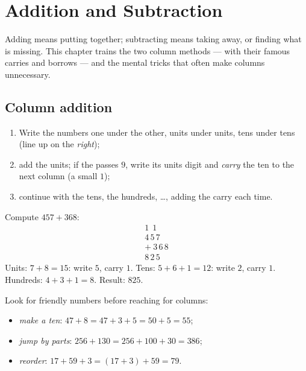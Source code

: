 \chapter{Addition and Subtraction}\label{ch:g3:addsub}

Adding means putting together; subtracting means taking away, or
finding what is missing. This chapter trains the two column methods
--- with their famous carries and borrows --- and the mental tricks
that often make columns unnecessary.

\section{Column addition}

\begin{method}\label{met:g3:addsub:add}
\begin{enumerate}
  \item Write the numbers one under the other, units under units,
        tens under tens (line up on the \emph{right});
  \item add the units; if the  passes $9$, write its units digit
        and \emph{carry} the ten to the next column (a small $1$);
  \item continue with the tens, the hundreds, \dots, adding the carry
        each time.
\end{enumerate}
\end{method}

\begin{example}\label{ex:g3:addsub:add}
Compute $457 + 368$:
\[
\begin{array}{r}
{\scriptstyle 1}\ \ {\scriptstyle 1}\ \ \phantom{0} \\[-3pt]
4\,5\,7 \\
+\ 3\,6\,8 \\
\hline
8\,2\,5
\end{array}
\]
Units: $7 + 8 = 15$: write $5$, carry $1$. Tens:
$5 + 6 + 1 = 12$: write $2$, carry $1$. Hundreds: $4 + 3 + 1 = 8$.
Result: $825$.
\end{example}

\begin{example}\label{ex:g3:addsub:mental}
Look for friendly numbers before reaching for columns:
\begin{itemize}
  \item \emph{make a ten}: $47 + 8 = 47 + 3 + 5 = 50 + 5 = 55$;
  \item \emph{jump by parts}: $256 + 130 = 256 + 100 + 30 = 386$;
  \item \emph{reorder}: $17 + 59 + 3 = (17 + 3) + 59 = 79$.
\end{itemize}
\end{example}

